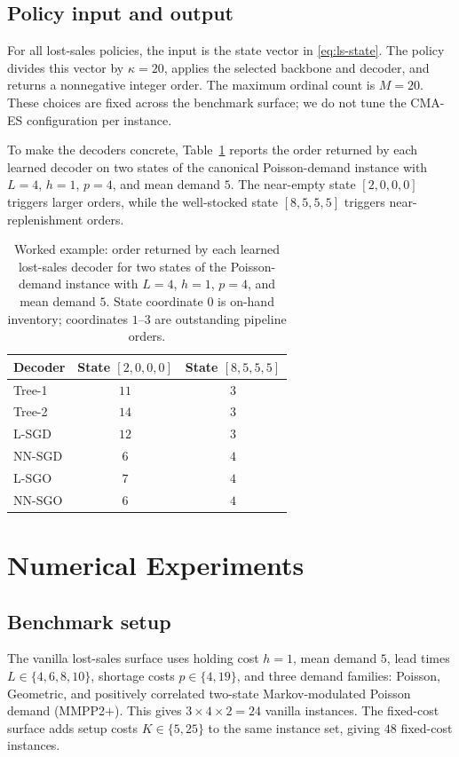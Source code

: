 \documentclass[authoryear,11pt]{elsarticle}
\begin{document}
\subsection{Policy input and output}

For all lost-sales policies, the input is the state vector in \eqref{eq:ls-state}. The policy divides this vector by $\kappa=20$, applies the selected backbone and decoder, and returns a nonnegative integer order. The maximum ordinal count is $M=20$. These choices are fixed across the benchmark surface; we do not tune the CMA-ES configuration per instance.

To make the decoders concrete, Table~\ref{tab:worked} reports the order returned by each learned decoder on two states of the canonical Poisson-demand instance with $L=4$, $h=1$, $p=4$, and mean demand $5$. The near-empty state $[2,0,0,0]$ triggers larger orders, while the well-stocked state $[8,5,5,5]$ triggers near-replenishment orders.

\begin{table}[!htbp]
\centering
\small
\caption{Worked example: order returned by each learned lost-sales decoder for two states of the Poisson-demand instance with $L=4$, $h=1$, $p=4$, and mean demand $5$. State coordinate $0$ is on-hand inventory; coordinates $1$--$3$ are outstanding pipeline orders.}
\label{tab:worked}
\begin{tabular}{lcc}
\toprule
Decoder & State $[2,0,0,0]$ & State $[8,5,5,5]$ \\
\midrule
Tree-1 & $11$ & $3$ \\
Tree-2 & $14$ & $3$ \\
L-SGD & $12$ & $3$ \\
NN-SGD & $6$ & $4$ \\
L-SGO & $7$ & $4$ \\
NN-SGO & $6$ & $4$ \\
\bottomrule
\end{tabular}
\end{table}

\section{Numerical Experiments}
\label{sec:experiments}

\subsection{Benchmark setup}

The vanilla lost-sales surface uses holding cost $h=1$, mean demand $5$, lead times $L\in\{4,6,8,10\}$, shortage costs $p\in\{4,19\}$, and three demand families: Poisson, Geometric, and positively correlated two-state Markov-modulated Poisson demand (MMPP2$+$). This gives $3\times4\times2=24$ vanilla instances. The fixed-cost surface adds setup costs $K\in\{5,25\}$ to the same instance set, giving $48$ fixed-cost instances.
\end{document}
